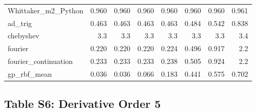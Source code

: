 \begin{longtable}{lrrrrrrr}
Whittaker\_m2\_Python & 0.960 & 0.960 & 0.960 & 0.960 & 0.960 & 0.960 & 0.961 \\
ad\_trig & 0.463 & 0.463 & 0.463 & 0.463 & 0.484 & 0.542 & 0.838 \\
chebyshev & 3.3 & 3.3 & 3.3 & 3.3 & 3.3 & 3.3 & 3.4 \\
fourier & 0.220 & 0.220 & 0.220 & 0.224 & 0.496 & 0.917 & 2.2 \\
fourier\_continuation & 0.233 & 0.233 & 0.233 & 0.238 & 0.505 & 0.924 & 2.2 \\
gp\_rbf\_mean & 0.036 & 0.036 & 0.066 & 0.183 & 0.441 & 0.575 & 0.702 \\
\bottomrule
\end{longtable}

\clearpage

\subsection*{Table S6: Derivative Order 5}

